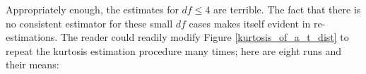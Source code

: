 \begin{center}
\end{center}


Appropriately enough, the estimates for $df\leq 4$ are terrible.  
The fact that there is no consistent estimator for these small 
$df$ cases makes itself evident in re-estimations. The reader could readily
modify Figure \ref{kurtosis_of_a_t_dist} to repeat the kurtosis estimation
procedure many times; here are eight runs and their means:

